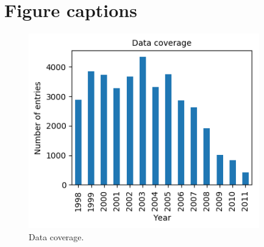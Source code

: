 \documentclass[utf8]{frontiersSCNS} %
\begin{document}
\section*{Figure captions}



\begin{figure}[h!]
	\begin{center}
		\includegraphics[width=10cm]{Amaya/datacoverage}%
	\end{center}
	\caption{ Data coverage.}\label{fig:datacoverage}
\end{figure}
\end{document}
